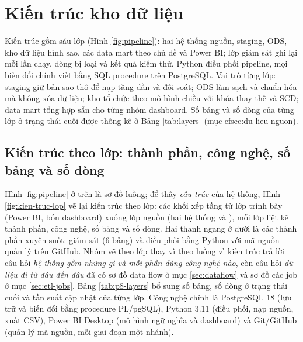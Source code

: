 \section{Kiến trúc kho dữ liệu}\label{sec:kien-truc}
Kiến trúc gồm sáu lớp (Hình \ref{fig:pipeline}): hai hệ thống nguồn, staging, ODS, kho dữ liệu hình sao, các data mart theo chủ đề và Power BI; lớp giám sát  ghi lại mỗi lần chạy, dòng bị loại và kết quả kiểm thử. Python điều phối pipeline, mọi biến đổi chính viết bằng SQL procedure trên PostgreSQL. Vai trò từng lớp: staging giữ bản sao thô để nạp tăng dần và đối soát; ODS làm sạch và chuẩn hóa mà không xóa dữ liệu; kho tổ chức theo mô hình chiều với khóa thay thế và SCD; data mart tổng hợp sẵn cho từng nhóm dashboard.
Số bảng và số dòng của từng lớp ở trạng thái cuối được thống kê ở Bảng \ref{tab:layers} (mục 
ef{sec:du-lieu-nguon}).

\subsection{Kiến trúc theo lớp: thành phần, công nghệ, số bảng và số dòng}\label{sec:kien-truc-lop}
Hình \ref{fig:pipeline} ở trên là sơ đồ luồng; để thấy \emph{cấu trúc} của hệ thống, Hình \ref{fig:kien-truc-lop} vẽ lại kiến trúc theo lớp: các khối xếp tầng từ lớp trình bày (Power BI, bốn dashboard) xuống lớp nguồn (hai hệ thống  và ), mỗi lớp liệt kê thành phần, công nghệ, số bảng và số dòng. Hai thanh ngang ở dưới là các thành phần xuyên suốt: giám sát  (6 bảng) và điều phối bằng Python với mã nguồn quản lý trên GitHub. Nhóm vẽ theo lớp thay vì theo luồng vì kiến trúc trả lời câu hỏi \emph{hệ thống gồm những gì và mỗi phần dùng công nghệ nào}, còn câu hỏi \emph{dữ liệu đi từ đâu đến đâu} đã có sơ đồ data flow ở mục \ref{sec:dataflow} và sơ đồ các job ở mục \ref{sec:etl-jobs}.
Bảng \ref{tab:p8-layers} bổ sung số bảng, số dòng ở trạng thái cuối và tần suất cập nhật của từng lớp. Công nghệ chính là PostgreSQL 18 (lưu trữ và biến đổi bằng procedure PL/pgSQL), Python 3.11 (điều phối, nạp nguồn, xuất CSV), Power BI Desktop (mô hình ngữ nghĩa và dashboard) và Git/GitHub (quản lý mã nguồn, mỗi giai đoạn một nhánh).

